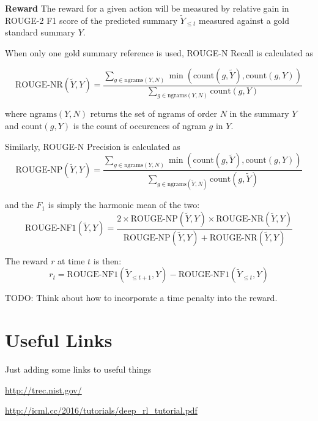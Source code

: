 \documentclass[12pt]{article}
\begin{document}
    \textbf{Reward} 
    The reward for a given action will be measured by relative gain in 
    ROUGE-2 F1 score of the predicted summary $\tilde{Y}_{\le t}$ measured
    against a gold standard summary $Y$.


     
    When only one gold summary reference is used, ROUGE-N Recall is calculated
    as 

    \[ \textrm{ROUGE-NR}(\tilde{Y}, Y) = 
        \frac{\sum_{g \in \textrm{ngrams}(Y,N)} 
        \min \left(\textrm{count}(g, \tilde{Y}), \textrm{count}(g, Y)\right)}{
        \sum_{g \in \textrm{ngrams}(Y,N)} 
        \textrm{count}(g, Y)
        }
    \]

    where $\textrm{ngrams}(Y, N)$ returns the set of ngrams of order $N$ in 
    the summary $Y$ and $\textrm{count}(g, Y)$ is the count of occurences of
    ngram $g$ in $Y.$

    Similarly, ROUGE-N Precision is calculated as 
    \[ \textrm{ROUGE-NP}(\tilde{Y}, Y) = 
        \frac{\sum_{g \in \textrm{ngrams}(Y,N)} 
        \min \left(\textrm{count}(g, \tilde{Y}), \textrm{count}(g, Y)\right)}{
            \sum_{g \in \textrm{ngrams}(\tilde{Y},N)} 
            \textrm{count}(g, \tilde{Y})
        }
    \]

    and the $F_1$ is simply the harmonic mean of the two:
    \[ \textrm{ROUGE-NF1}(\tilde{Y}, Y) = \frac{ 2 \times 
    \textrm{ROUGE-NP}(\tilde{Y}, Y) \times \textrm{ROUGE-NR}(\tilde{Y}, Y)
    }{ \textrm{ROUGE-NP}(\tilde{Y}, Y) + \textrm{ROUGE-NR}(\tilde{Y}, Y) } \]
        


    The reward $r$ at time $t$ is then:
    \[ r_t = \textrm{ROUGE-NF1}(\tilde{Y}_{\le t+1}, Y) - 
    \textrm{ROUGE-NF1}(\tilde{Y}_{\le t}, Y) \]

    TODO: Think about how to incorporate a time penalty into the reward.

\section{Useful Links}

Just adding some links to useful things 

\url{http://trec.nist.gov/}

\url{http://icml.cc/2016/tutorials/deep_rl_tutorial.pdf}
\end{document}
